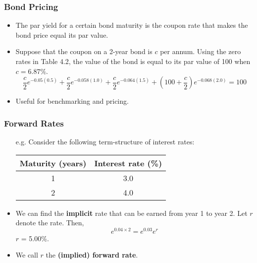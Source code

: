 \documentclass[10pt]{beamer}
\begin{document}
\begin{frame}
	\frametitle{Bond Pricing}
	\begin{itemize}\itemsep10pt
		\item The par yield for a certain bond maturity is the coupon rate that makes the bond price equal its par value. 
		\item Suppose that the coupon on a 2-year bond is $c$ per annum. Using the zero rates in Table 4.2, the
		value of the bond is equal to its par value of 100 when $c=6.87\%$.
		$$
		\frac{c}{2}e^{-0.05(0.5)} + \frac{c}{2}e^{-0.058(1.0)} + \frac{c}{2}e^{-0.064(1.5)} + \left(100+\frac{c}{2}\right)e^{-0.068(2.0)} = 100
		$$
		
		\item Useful for benchmarking and pricing.
	\end{itemize}
\end{frame}



\begin{frame}
	\frametitle{Forward Rates}
	\begin{itemize}\itemsep15pt
		\item[e.g.] Consider the following term-structure of interest rates: \\ \vspace{5pt}
		\begin{center}
			\begin{tabular}{cc}
			\hline
			Maturity (years) & Interest rate (\%) \\
			\hline
			1 & 3.0 \\
			2 & 4.0 \\
			\hline
			\end{tabular}
		\end{center}
		\item We can find the \textbf{implicit} rate that can be earned from year 1 to year 2. Let $r$ denote the rate. Then,
		$$
			e^{0.04\times 2} = e^{0.03}e^r
		$$ 	
		$r$ = 5.00\%.
		\item We call $r$ the \textbf{(implied) forward rate}.
	\end{itemize}		
\end{frame}
\end{document}

